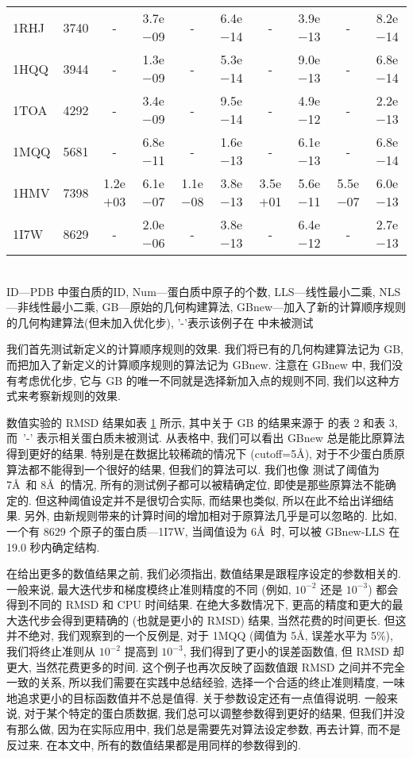 \documentclass{CASthesis_zzk}
\begin{document}
\begin{table}[!htbp]
{\begin{tabular}{lrcccccccc}
      1RHJ & 3740 &     -     & 3.7e$-$09 &     -     & 6.4e$-$14 &     -     & 3.9e$-$13 &     -    & 8.2e$-$14  \\
      1HQQ & 3944 &     -     & 1.3e$-$09 &     -     & 5.3e$-$14 &     -     & 9.0e$-$13 &     -    & 6.8e$-$14  \\
      1TOA & 4292 &     -     & 3.4e$-$09 &     -     & 9.5e$-$14 &     -     & 4.9e$-$12 &     -    & 2.2e$-$13  \\
      1MQQ & 5681 &     -     & 6.8e$-$11 &     -     & 1.6e$-$13 &     -     & 6.1e$-$13 &     -    & 6.8e$-$14  \\
      1HMV & 7398 & 1.2e$+$03 & 6.1e$-$07 & 1.1e$-$08 & 3.8e$-$13 & 3.5e$+$01 & 5.6e$-$11 & 5.5e$-$07& 6.0e$-$13  \\
      1I7W & 8629 &     -     & 2.0e$-$06 &     -     & 3.8e$-$13 &     -     & 6.4e$-$12 &     -    & 2.7e$-$13  \\ \toprule
    \end{tabular}\\[-4mm]
    \label{table:exact}
    \bl *ID---PDB 中蛋白质的ID, Num---蛋白质中原子的个数, LLS---线性最小二乘, NLS---非线性最小二乘, GB---原始的几何构建算法, GBnew---加入了新的计算顺序规则的几何构建算法(但未加入优化步), '-'表示该例子在 \cite{Sit2009} 中未被测试 \el
  }
\end{table}

我们首先测试新定义的计算顺序规则的效果.
我们将已有的几何构建算法记为 GB, 
而把加入了新定义的计算顺序规则的算法记为 GBnew.
注意在 GBnew 中, 我们没有考虑优化步,
它与 GB 的唯一不同就是选择新加入点的规则不同, 
我们以这种方式来考察新规则的效果.

数值实验的 RMSD 结果如表 \ref{table:exact} 所示, 
其中关于 GB 的结果来源于 \cite{Sit2009} 的表 2 和表 3, 
而~'-' 表示相关蛋白质未被测试. 
从表格中, 我们可以看出 GBnew 总是能比原算法得到更好的结果.
特别是在数据比较稀疏的情况下 (cutoff=5\AA), 
对于不少蛋白质原算法都不能得到一个很好的结果,
但我们的算法可以.
我们也像 \cite{Sit2009} 测试了阈值为 7\AA ~和 8\AA~的情况, 
所有的测试例子都可以被精确定位, 即使是那些原算法不能确定的.
但这种阈值设定并不是很切合实际, 而结果也类似, 所以在此不给出详细结果.
另外, 由新规则带来的计算时间的增加相对于原算法几乎是可以忽略的.
比如, 一个有 8629 个原子的蛋白质---1I7W, 当阈值设为 6\AA ~时,
可以被 GBnew-LLS 在 19.0 秒内确定结构.

在给出更多的数值结果之前, 我们必须指出,
数值结果是跟程序设定的参数相关的.
一般来说, 最大迭代步和梯度模终止准则精度的不同 (例如, $10^{-2}$ 还是 $10^{-3}$) 
都会得到不同的 RMSD 和 CPU 时间结果. 
在绝大多数情况下, 更高的精度和更大的最大迭代步会得到更精确的 (也就是更小的 RMSD)
结果, 当然花费的时间更长.
但这并不绝对, 我们观察到的一个反例是,
对于 1MQQ (阈值为 5\AA, 误差水平为 5\%), 
我们将终止准则从 $10^{-2}$ 提高到 $10^{-3}$, 
我们得到了更小的误差函数值, 但 RMSD 却更大, 当然花费更多的时间.
这个例子也再次反映了函数值跟 RMSD 之间并不完全一致的关系,
所以我们需要在实践中总结经验, 选择一个合适的终止准则精度, 
一味地追求更小的目标函数值并不总是值得.
关于参数设定还有一点值得说明.
一般来说, 对于某个特定的蛋白质数据, 我们总可以调整参数得到更好的结果,
但我们并没有那么做, 因为在实际应用中, 
我们总是需要先对算法设定参数, 再去计算, 而不是反过来.
在本文中, 所有的数值结果都是用同样的参数得到的.
\end{document}
